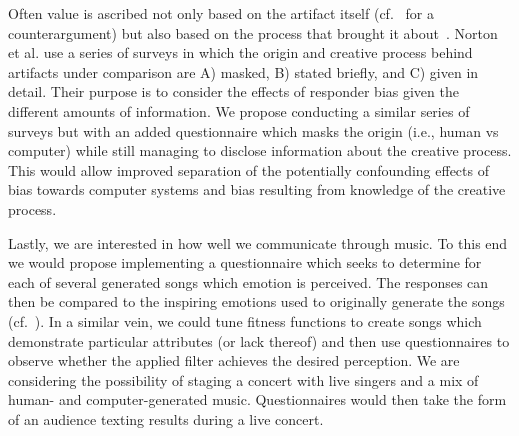 \documentclass[11pt,phd]{byuprop}
\begin{document}
Often value is ascribed not only based on the artifact itself (cf.~\cite{ritchie2007some} for a counterargument) but also based on the process that brought it about~\cite{colton2012computational}. Norton et al. \cite{norton2015accounting} use a series of surveys in which the origin and creative process behind artifacts under comparison are A) masked, B) stated briefly, and C) given in detail. Their purpose is to consider the effects of responder bias given the different amounts of information. We propose conducting a similar series of surveys but with an added questionnaire which masks the origin (i.e., human vs computer) while still managing to disclose information about the creative process. This would allow improved separation of the potentially confounding effects of bias towards computer systems and bias resulting from knowledge of the creative process.

Lastly, we are interested in how well we communicate through music. To this end we would propose implementing a questionnaire which seeks to determine for each of several generated songs which emotion is perceived. The responses can then be compared to the inspiring emotions used to originally generate the songs (cf.~\cite{monteith2010automatic}). In a similar vein, we could tune fitness functions to create songs which demonstrate particular attributes (or lack thereof) and then use questionnaires to observe whether the applied filter achieves the desired perception. We are considering the possibility of staging a concert with live singers and a mix of human- and computer-generated music. Questionnaires would then take the form of an audience texting results during a live concert. 

\end{document}
